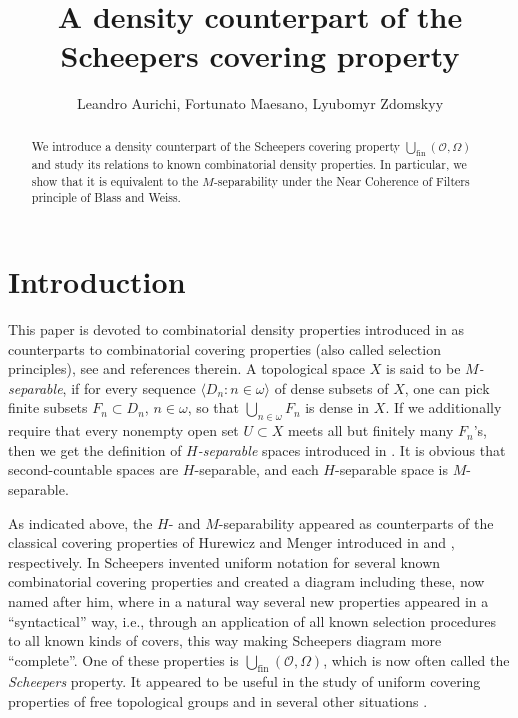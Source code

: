 \documentclass[12pt,a4paper]{amsart}
\title[$S$-separable spaces]{A density counterpart of the Scheepers covering property}
\author[L. Aurichi, F. Maesano,  L. Zdomskyy]{Leandro Aurichi, Fortunato Maesano,  Lyubomyr Zdomskyy}
\theoremstyle{definition}
\newcommand{\w}{\omega}
\newcommand{\la}{\langle}
\newcommand{\ra}{\rangle}
\begin{document}
\begin{abstract}
We introduce  a density counterpart of the Scheepers covering property
$\bigcup_{\mathrm{fin}}(\mathcal O,\Omega)$ and study its relations to
 known combinatorial density {properties}. In particular, we show that it is equivalent to the $M$-separability under the Near Coherence of Filters principle of Blass and Weiss.
\end{abstract}

\maketitle

\section{Introduction}
This paper is devoted to combinatorial density properties introduced in 
\cite{Sch99} as counterparts to combinatorial covering properties (also called selection principles), see \cite{coc1,coc2} and references therein. 
 A topological
space $X$ is said \cite{Sch99} to be \emph{$M$-separable}, if for every sequence 
$\la D_n:n\in\w\ra$
of dense subsets of $X$, one can pick finite subsets $F_n\subset D_n$,
$n\in\w$, so that $\bigcup_{n\in\w}F_n$ is dense in $X$.
If we additionally require that 
 every
nonempty open set $U\subset X$ meets all but finitely many $F_n$’s,
then we get the definition of \emph{$H$-separable} spaces introduced in \cite{BelBonMat09}. 
 It is obvious that second-countable spaces  are $H$-separable, and each $H$-separable space is
$M$-separable. 

As indicated above, the $H$- and $M$-separability appeared as counterparts of the classical covering properties of Hurewicz and Menger introduced in \cite{Hur27} and \cite{Men24}, respectively. In \cite{coc1} Scheepers invented
uniform notation for several known combinatorial covering properties 
and created a diagram including these, now named after him,  where in a natural way several new properties appeared in a ``syntactical'' way, i.e., through an application of all known selection procedures to all known kinds of covers, this way making Scheepers diagram more ``complete''.
One of these properties is $\bigcup_{\mathrm{fin}}(\mathcal O,\Omega)$, which is now often called the \emph{Scheepers} property. It appeared to be useful in the study of uniform covering properties of free topological groups \cite{Zdo06} and in several other situations \cite{SzeTsaZdo21}. 
\end{document}
